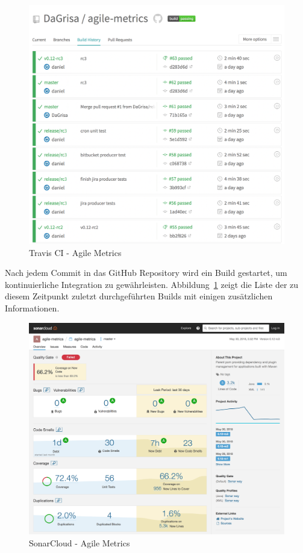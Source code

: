 \begin{savenotes}
    \begin{figure}[H] 
        \centering
            \includegraphics[width=1.0\textwidth]{img/travisci.png}
        \caption{Travis CI {-} Agile Metrics}\label{fig:travisci}
    \end{figure}
\end{savenotes}

Nach jedem Commit in das GitHub Repository wird ein Build gestartet, um kontinuierliche Integration zu gewährleisten.
Abbildung~\ref{fig:travisci} zeigt die Liste der zu diesem Zeitpunkt zuletzt durchgeführten Builds mit einigen zusätzlichen Informationen.

\begin{savenotes}
    \begin{figure}[H] 
        \centering
            \includegraphics[width=1.0\textwidth]{img/sonarcloud.png}
        \caption{SonarCloud {-} Agile Metrics}\label{fig:sonarcloud}
    \end{figure}
\end{savenotes}

